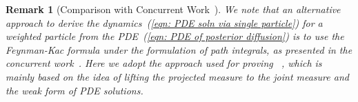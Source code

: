 \documentclass{article}
\numberwithin{equation}{section}
\newtheorem{remark}[theorem]{Remark}
\def\eqref#1{(\ref{#1})}
\begin{document}
\begin{remark}[Comparison with Concurrent Work~\cite{skreta2025feynman}]
    We note that an alternative approach to derive the dynamics~\eqref{eqn: PDE soln via single particle} for a weighted particle from the PDE~\eqref{eqn: PDE of posterior diffusion} is to use the Feynman-Kac formula under the formulation of path integrals, as presented in the concurrent work~\cite[Appendix A]{skreta2025feynman}. Here we adopt the approach used for proving ~\cite[Lemma 1 and 10]{domingo2020mean}, which is mainly based on the idea of lifting the projected measure to the joint measure and the weak form of PDE solutions. 

    \label{rmk: difference between our dynamics and FK corrector}    


\end{remark}
\end{document}
